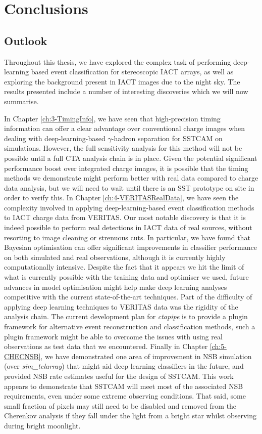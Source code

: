 \chapter{\label{ch6-Conclusions} Conclusions}
\minitoc
\section{Outlook}
Throughout this thesis, we have explored the complex task of performing deep-learning based event classification for stereoscopic IACT arrays, as well as exploring the background present in IACT images due to the night sky. The results presented include a number of interesting discoveries which we will now summarise.

In Chapter \ref{ch:3-TimingInfo}, we have seen that high-precision timing information can offer a clear advantage over conventional charge images when dealing with deep-learning-based $\gamma$-hadron separation for SSTCAM on simulations. However, the full sensitivity analysis for this method will not be possible until a full CTA analysis chain is in place. Given the potential significant performance boost over integrated charge images, it is possible that the timing methods we demonstrate might perform better with real data compared to charge data analysis, but we will need to wait until there is an SST prototype on site in order to verify this. In Chapter \ref{ch:4-VERITASRealData}, we have seen the complexity involved in applying deep-learning-based event classification methods to IACT charge data from VERITAS. Our most notable discovery is that it is indeed possible to perform real detections in IACT data of real sources, without resorting to image cleaning or strenuous cuts. In particular, we have found that Bayesian optimisation can offer significant improvements in classifier performance on both simulated and real observations, although it is currently highly computationally intensive. Despite the fact that it appears we hit the limit of what is currently possible with the training data and optimiser we used, future advances in model optimisation might help make deep learning analyses competitive with the current state-of-the-art techniques. Part of the difficulty of applying deep learning techniques to VERITAS data was the rigidity of the analysis chain. The current development plan for \textit{ctapipe} is to provide a plugin framework for alternative event reconstruction and classification methods, such a plugin framework might be able to overcome the issues with using real observations as test data that we encountered. Finally in Chapter \ref{ch:5-CHECNSB}, we have demonstrated one area of improvement in NSB simulation (over \textit{sim\_telarray}) that might aid deep learning classifiers in the future, and provided NSB rate estimates useful for the design of SSTCAM. This work appears to demonstrate that SSTCAM will meet most of the associated NSB requirements, even under some extreme observing conditions. That said, some small fraction of pixels may still need to be disabled and removed from the Cherenkov analysis if they fall under the light from a bright star whilst observing during bright moonlight.

